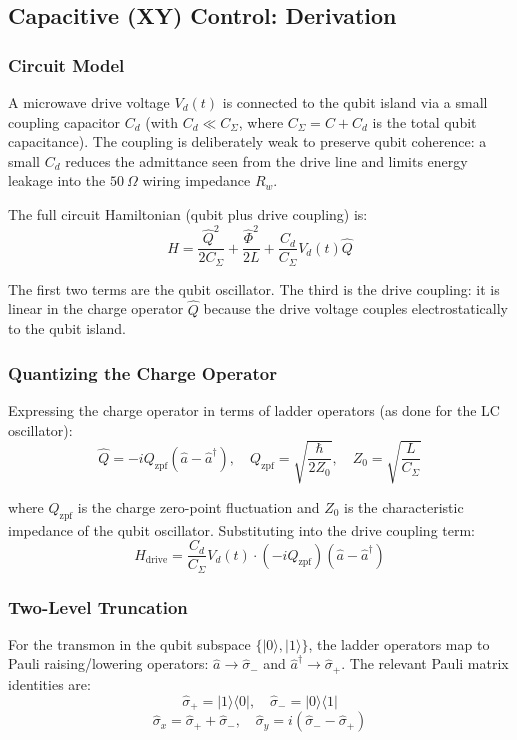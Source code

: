 \documentclass{article}
\begin{document}
\subsection{Capacitive (XY) Control: Derivation}

\subsubsection*{Circuit Model}

A microwave drive voltage $V_d(t)$ is connected to the qubit island via a small coupling capacitor $C_d$ (with $C_d \ll C_\Sigma$, where $C_\Sigma = C + C_d$ is the total qubit capacitance). The coupling is deliberately weak to preserve qubit coherence: a small $C_d$ reduces the admittance seen from the drive line and limits energy leakage into the $50~\Omega$ wiring impedance $R_w$.

The full circuit Hamiltonian (qubit plus drive coupling) is:
$$H = \frac{\hat{Q}^2}{2C_\Sigma} + \frac{\hat{\Phi}^2}{2L} + \frac{C_d}{C_\Sigma} V_d(t) \hat{Q}$$

The first two terms are the qubit oscillator. The third is the drive coupling: it is linear in the charge operator $\hat{Q}$ because the drive voltage couples electrostatically to the qubit island.

\subsubsection*{Quantizing the Charge Operator}

Expressing the charge operator in terms of ladder operators (as done for the LC oscillator):
$$\hat{Q} = -i Q_{\text{zpf}} (\hat{a} - \hat{a}^\dagger), \quad Q_{\text{zpf}} = \sqrt{\frac{\hbar}{2Z_0}}, \quad Z_0 = \sqrt{\frac{L}{C_\Sigma}}$$

where $Q_{\text{zpf}}$ is the charge zero-point fluctuation and $Z_0$ is the characteristic impedance of the qubit oscillator. Substituting into the drive coupling term:
$$H_{\text{drive}} = \frac{C_d}{C_\Sigma} V_d(t) \cdot (-i Q_{\text{zpf}})(\hat{a} - \hat{a}^\dagger)$$

\subsubsection*{Two-Level Truncation}

For the transmon in the qubit subspace $\{|0\rangle, |1\rangle\}$, the ladder operators map to Pauli raising/lowering operators: $\hat{a} \to \hat{\sigma}_-$ and $\hat{a}^\dagger \to \hat{\sigma}_+$. The relevant Pauli matrix identities are:
$$\hat{\sigma}_+ = |1\rangle\langle 0|, \quad \hat{\sigma}_- = |0\rangle\langle 1|$$
$$\hat{\sigma}_x = \hat{\sigma}_+ + \hat{\sigma}_-, \quad \hat{\sigma}_y = i(\hat{\sigma}_- - \hat{\sigma}_+)$$
\end{document}
